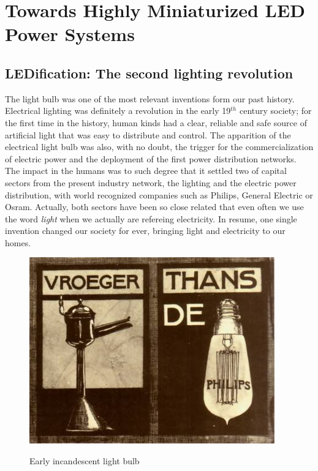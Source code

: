 \part{Towards Highly Miniaturized LED Power Systems }
\label{ch:twrd_HMLED}

\chapter{LEDification: The second lighting revolution}


The light bulb was one of the most relevant inventions form our past history.  Electrical lighting was definitely a revolution in the early 19$^{th}$ century society; for the first time in the history, human kinds had a clear, reliable and safe source of artificial light that was easy to distribute and control. The apparition  of the electrical light bulb was also, with no doubt, the trigger for the commercialization of electric power and the deployment of the first power distribution networks.  The impact in the humans was to such degree that it settled two of capital sectors from the present industry network, the lighting and the electric power distribution, with  world recognized companies such as Philips, General Electric or Osram.  Actually, both sectors have been so close related that even often we use the word \emph{light} when we actually are refereing electricity. In resume, one single invention changed our society for ever, bringing light and electricity to our homes.

\begin{figure}[!h]
\centering
\includegraphics{./0_intro/img/1900-philips3.jpg}
\label{fig:incandescent_light_blub}
\caption{Early incandescent light bulb}
\end{figure}


